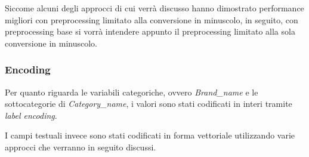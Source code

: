 Siccome alcuni degli approcci di cui verrà discusso hanno dimostrato performance migliori
con preprocessing limitato alla conversione in minuscolo, in seguito, con
preprocessing base si vorrà intendere appunto il preprocessing limitato alla sola
conversione in minuscolo.

\subsubsection{Encoding}

Per quanto riguarda le variabili categoriche, ovvero \textit{Brand\_name} e le
sottocategorie di \textit{Category\_name},
i valori sono stati codificati in interi tramite \textit{label encoding}.

I campi testuali invece sono stati codificati in forma vettoriale utilizzando
varie approcci che verranno in seguito discussi.


